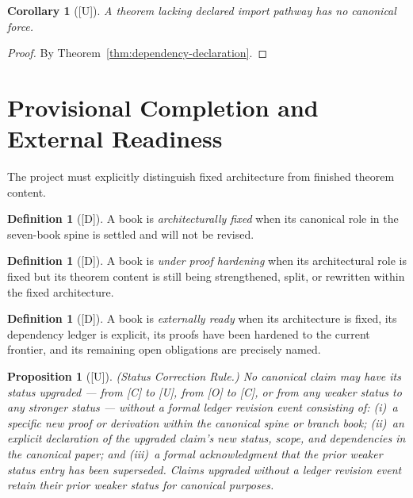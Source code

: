 \documentclass[12pt,oneside]{amsbook}
\theoremstyle{plain}
\newtheorem{proposition}[theorem]{Proposition}
\newtheorem{corollary}[theorem]{Corollary}
\theoremstyle{definition}
\newtheorem{definition}[theorem]{Definition}
\theoremstyle{remark}
\newcommand{\status}[1]{\textup{[#1]}}
\begin{document}
\begin{corollary}[\status{U}]\label{cor:undeclared-noncanonicalnical}
A theorem lacking declared import pathway has no canonical force.
\end{corollary}

\begin{proof}
By Theorem~\ref{thm:dependency-declaration}.
\end{proof}

\section{Provisional Completion and External Readiness}

The project must explicitly distinguish fixed architecture from
finished theorem content.

\begin{definition}[\status{D}]\label{def:architecturally-fixed}
A book is \emph{architecturally fixed} when its canonical role in the
seven-book spine is settled and will not be revised.
\end{definition}

\begin{definition}[\status{D}]\label{def:proof-hardening}
A book is \emph{under proof hardening} when its architectural role is
fixed but its theorem content is still being strengthened, split, or
rewritten within the fixed architecture.
\end{definition}

\begin{definition}[\status{D}]\label{def:externally-ready}
A book is \emph{externally ready} when its architecture is fixed, its
dependency ledger is explicit, its proofs have been hardened to the
current frontier, and its remaining open obligations are precisely
named.
\end{definition}


\begin{proposition}[\status{U}]\label{prop:status-correction}
\textup{(Status Correction Rule.)}  No canonical claim may have its
status upgraded --- from [C] to [U], from [O] to [C], or from any
weaker status to any stronger status --- without a formal ledger
revision event consisting of: (i)~a specific new proof or derivation
within the canonical spine or branch book; (ii)~an explicit declaration
of the upgraded claim's new status, scope, and dependencies in the
canonical paper; and (iii)~a formal acknowledgment that the prior
weaker status entry has been superseded.  Claims upgraded without a
ledger revision event retain their prior weaker status for canonical
purposes.
\end{proposition}
\end{document}
